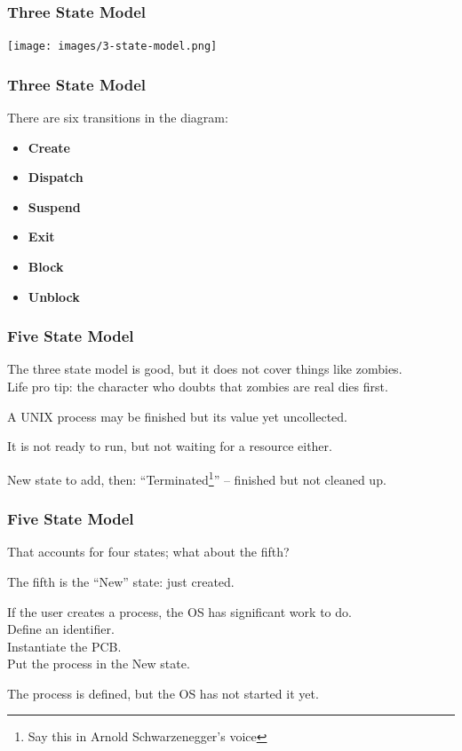 \begin{frame}
\frametitle{Three State Model}

\begin{center}
\texttt{[image: images/3-state-model.png]}
\end{center}


\end{frame}

\begin{frame}
\frametitle{Three State Model}

There are six transitions in the diagram:
\begin{itemize}
	\item \textbf{Create}
	\item \textbf{Dispatch}
	\item \textbf{Suspend}
	\item \textbf{Exit}
	\item \textbf{Block}
	\item \textbf{Unblock}
\end{itemize}

\end{frame}

\begin{frame}
\frametitle{Five State Model}

The three state model is good, but it does not cover things like zombies.\\
\quad Life pro tip: the character who doubts that zombies are real dies first.

A UNIX process may be finished but its value yet uncollected.

It is not ready to run, but not waiting for a resource either.

New state to add, then: ``Terminated\footnote{Say this in Arnold Schwarzenegger's voice}'' -- finished but not cleaned up.

\end{frame}

\begin{frame}
\frametitle{Five State Model}
That accounts for four states; what about the fifth?

The fifth is the ``New'' state: just created.

If the user creates a process, the OS has significant work to do.\\
\quad Define an identifier.\\
\quad Instantiate the PCB.\\
\quad Put the process in the New state.

The process is defined, but the OS has not started it yet.

\end{frame}

